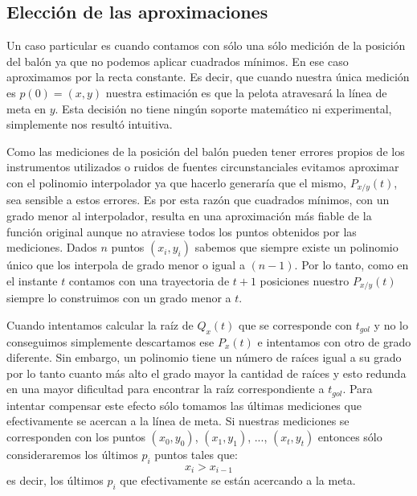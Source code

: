 \subsection{Elección de las aproximaciones}
Un caso particular es cuando contamos con sólo una sólo medición de la posición del balón ya que no podemos aplicar cuadrados mínimos. En
ese caso aproximamos por la recta constante. Es decir, que cuando nuestra única medición es $p(0) = (x, y)$ nuestra estimación es que la 
pelota atravesará la línea de meta en $y$. Esta decisión no tiene ningún soporte matemático ni experimental, simplemente nos resultó
intuitiva.
\par
Como las mediciones de la posición del balón pueden tener errores propios de los instrumentos utilizados o ruidos de fuentes circunstanciales
evitamos aproximar con el polinomio interpolador ya que hacerlo generaría que el mismo, $P_{x/y}(t)$, sea sensible a estos errores. Es por esta
razón que cuadrados mínimos, con un grado menor al interpolador, resulta en una aproximación más fiable de la función original aunque 
no atraviese todos los puntos obtenidos por las mediciones. Dados $n$ puntos $(x_i, y_i)$ sabemos que siempre existe un polinomio único 
que los interpola de grado menor o igual a $(n-1)$. Por lo tanto, como en el instante $t$ contamos con una trayectoria de $t+1$
posiciones nuestro $P_{x/y}(t)$ siempre lo construimos con un grado menor a $t$.
\par
Cuando intentamos calcular la raíz de $Q_x(t)$ que se corresponde con $t_{gol}$ y no lo conseguimos simplemente descartamos ese $P_x(t)$
e intentamos con otro de grado diferente. Sin embargo, un polinomio tiene un número de raíces igual a su grado por lo tanto cuanto más 
alto el grado mayor la cantidad de raíces y esto redunda en una mayor dificultad para encontrar la raíz correspondiente a $t_{gol}$. Para
intentar compensar este efecto sólo tomamos las últimas mediciones que efectivamente se acercan a la línea de meta. Si nuestras mediciones
se corresponden con los puntos $(x_0, y_0)$, $(x_1, y_1)$, ..., $(x_t, y_t)$ entonces sólo consideraremos los últimos $p_i$ puntos tales que:
\begin{displaymath}
x_i > x_{i-1}
\end{displaymath}
es decir, los últimos $p_i$ que efectivamente se están acercando a la meta.

